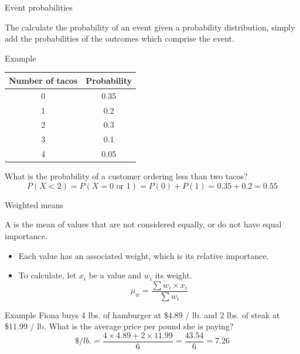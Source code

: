 \documentclass[xcolor=table]{beamer}
\begin{document}
\begin{frame}{Event probabilities}
\begin{block}{}
The calculate the probability of an event given a probability distribution, simply add the probabilities of the outcomes which comprise the event.
\end{block}
\pause
\begin{exampleblock}{Example}
{\centering \renewcommand{\arraystretch}{1}
\begin{tabular}{c | c}
Number of tacos & Probability\\
\hline
0 & 0.35\\
1 & 0.2\\
2 & 0.3\\
3 & 0.1\\
4 & 0.05
\end{tabular}\par
\renewcommand{\arraystretch}{1.5}}
\bigskip
What is the probability of a customer ordering less than two tacos?
\pause\[P(X<2) = P(X = 0 \text{ or } 1) = P(0) + P(1) = 0.35 + 0.2 = 0.55 \]
\end{exampleblock}
\end{frame}

\begin{frame}{Weighted means}
\begin{block}{}
{\large A  is the mean of values that are not considered equally, or do not have equal importance.}
\begin{itemize}
\item Each value has an associated weight, which is its relative importance.
\item To calculate, let $x_i$ be a value and $w_i$ its weight.
\[\mu_w = \frac {\sum w_i \times x_i}{\sum w_i}\]
\end{itemize}
\end{block}
\pause
\begin{exampleblock}{Example}
Fiona buys 4 lbs. of hamburger at \$4.89 / lb. and 2 lbs. of steak at \$11.99 / lb. What is the average price per pound she is paying?
\[ \$/lb. = \frac {4 \times 4.89 + 2 \times 11.99}{6} = \frac {43.54}{6} = 7.26\]
\end{exampleblock}
\end{frame}
\end{document}
